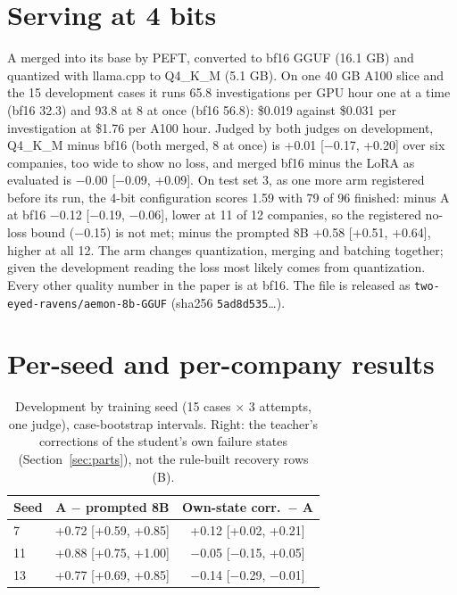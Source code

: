 \documentclass[11pt]{article}
\begin{document}
\section{Serving at 4 bits}
\label{app:q4}

A merged into its base by PEFT, converted to bf16 GGUF (16.1 GB) and quantized with llama.cpp to Q4\_K\_M (5.1 GB).
On one 40 GB A100 slice and the 15 development cases it runs 65.8 investigations per GPU hour one at a time (bf16 32.3)
and 93.8 at 8 at once (bf16 56.8): \$0.019 against \$0.031 per investigation at \$1.76 per A100 hour. Judged by both
judges on development, Q4\_K\_M minus bf16 (both merged, 8 at once) is +0.01 [$-$0.17, +0.20] over six companies, too
wide to show no loss, and merged bf16 minus the LoRA as evaluated is $-$0.00 [$-$0.09, +0.09]. On test set 3, as one more
arm registered before its run, the 4-bit configuration scores 1.59 with 79 of 96 finished: minus A at bf16
$-$0.12 [$-$0.19, $-$0.06], lower at 11 of 12 companies, so the registered no-loss bound ($-$0.15) is not met; minus the
prompted 8B +0.58 [+0.51, +0.64], higher at all 12. The arm changes quantization, merging and batching together; given
the development reading the loss most likely comes from quantization. Every other quality number in the paper is at
bf16. The file is released as \texttt{two-eyed-ravens/aemon-8b-GGUF} (sha256 \texttt{5ad8d535}\ldots).

\section{Per-seed and per-company results}
\label{app:detail}

\begin{table}[h]
\centering
\small
\setlength{\tabcolsep}{4pt}
\begin{tabular}{lcc}
\toprule
Seed & A $-$ prompted 8B & Own-state corr.\ $-$ A \\
\midrule
7 & +0.72 [+0.59, +0.85] & +0.12 [+0.02, +0.21] \\
11 & +0.88 [+0.75, +1.00] & $-$0.05 [$-$0.15, +0.05] \\
13 & +0.77 [+0.69, +0.85] & $-$0.14 [$-$0.29, $-$0.01] \\
\bottomrule
\end{tabular}
\caption{Development by training seed (15 cases $\times$ 3 attempts, one judge), case-bootstrap intervals. Right: the teacher's corrections of the student's own failure states (Section~\ref{sec:parts}), not the rule-built recovery rows (B).}
\end{table}
\end{document}
